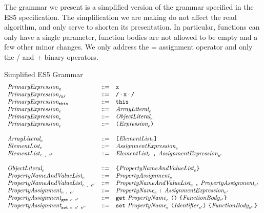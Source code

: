 \documentclass[preprint,10pt]{sigplanconf}
\begin{document}
The grammar we present is a simplified version of the grammar
specified in the ES5 specification. The simplification we are making
do not affect the read algorithm, and only serve to shorten its
presentation. In particular, functions can only have a single
parameter, function bodies are not allowed to be empty and a few other
minor changes. We only address the = assignment operator and only the
/ and + binary operators.

\begin{displayfigure*}{\label{fig:grammar}Simplified ES5 Grammar}
\[
\begin{array}{lcl}
  \textit{PrimaryExpression}_{\texttt{x}} &::=& \texttt{x} 
  \\
  \textit{PrimaryExpression}_{\texttt{/x/}} &::=& \texttt{/} \cdot \texttt{x} \cdot \texttt{/} 
  \\
  \textit{PrimaryExpression}_{\texttt{this}} &::=& \texttt{this}
  \\
  \textit{PrimaryExpression}_{e} &::=& 
  \textit{ArrayLiteral}_{e}
  \\
  \textit{PrimaryExpression}_{e} &::=& 
  \textit{ObjectLiteral}_{e}
  \\
  \textit{PrimaryExpression}_{e} &::=& 
  \texttt{(}\textit{Expression}_{e}\texttt{)}
  \\ \\
  \textit{ArrayLiteral}_{e} &::=&
  \texttt{[}\textit{ElementList}_{e}\texttt{]}
  \\
  \textit{ElementList}_{e} &::=&
  \textit{AssignmentExpression}_{e}
  \\
  \textit{ElementList}_{e~\texttt{,}~e'} &::=&
  \textit{ElementList}_{e}~\texttt{,}~\textit{AssignmentExpression}_{e'}
  \\ \\
  \textit{ObjectLiteral}_{e} &::=&
  \texttt{\{}\textit{PropertyNameAndValueList}_{e}\texttt{\}}
  \\
  \textit{PropertyNameAndValueList}_{e} &::=&
  \textit{PropertyAssignment}_{e}
  \\
  \textit{PropertyNameAndValueList}_{e~\texttt{,}~e'} &::=&
  \textit{PropertyNameAndValueList}_{e}~\texttt{,}~\textit{PropertyAssignment}_{e'}
  \\
  \textit{PropertyAssignment}_{e~\texttt{:}~e'} &::=&
  \textit{PropertyName}_{e}~\texttt{:}~\textit{AssignmentExpression}_{e'}
  \\
  \textit{PropertyAssignment}_{\texttt{get}~e~e'} &::=&
  \texttt{get}~\textit{PropertyName}_{e}~\texttt{(}\texttt{)}~\texttt{\{}\textit{FunctionBody}_{e'}\texttt{\}}
  \\
  \textit{PropertyAssignment}_{\texttt{set}~e~e'~e''} &::=&
  \texttt{set}~\textit{PropertyName}_{e}~\texttt{(}\textit{Identifier}_{e'}\texttt{)}~\texttt{\{}\textit{FunctionBody}_{e''}\texttt{\}}

\end{array}\]
\end{displayfigure*}
\end{document}
